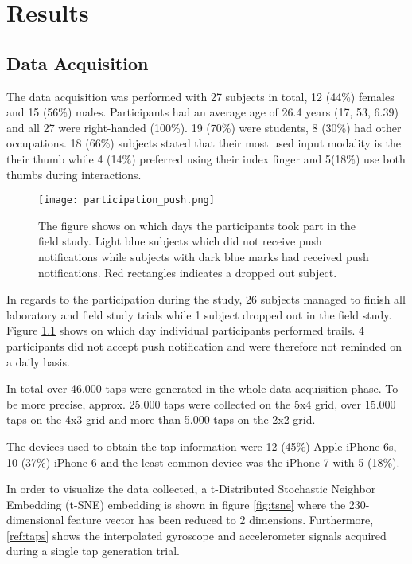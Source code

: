 \chapter{Results\label{cha:chapter6}}
\section{Data Acquisition}
The data acquisition was performed with 27 subjects in total, 12 (44\%) females and 15 (56\%) males. Participants had an average age of 26.4 years (17, 53, 6.39) and all 27 were right-handed (100\%). 19 (70\%) were students, 8 (30\%) had other occupations.
18 (66\%) subjects stated that their most used input modality is the their thumb while 4 (14\%) preferred using their index finger and 5(18\%) use both thumbs during interactions.\\

\begin{figure}[h!]
  \centering
  \texttt{[image: participation\_push.png]}
  \caption{The figure shows on which days the participants took part in the field study. Light blue subjects which did not receive push notifications while subjects with dark blue marks had received push notifications. Red rectangles indicates a dropped out subject.} \label{fig:participation}
\end{figure}

In regards to the participation during the study, 26 subjects managed to finish all laboratory and field study trials while 1 subject dropped out in the field study. Figure \ref{fig:participation} shows on which day individual participants performed trails. 4 participants did not accept push notification and were therefore not reminded on a daily basis.

In total over 46.000 taps were generated in the whole data acquisition phase. To be more precise, approx. 25.000 taps were collected on the 5x4 grid, over 15.000 taps on the 4x3 grid and more than 5.000 taps on the 2x2 grid.

The devices used to obtain the tap information were 12 (45\%) Apple iPhone 6s, 10 (37\%) iPhone 6 and the least common device was the iPhone 7 with 5 (18\%).

In order to visualize the data collected, a t-Distributed Stochastic Neighbor Embedding (t-SNE) embedding is shown in figure \ref{fig:tsne} where the 230-dimensional feature vector has been reduced to 2 dimensions. Furthermore, \ref{ref:taps} shows the interpolated gyroscope and accelerometer signals acquired during a single tap generation trial.

